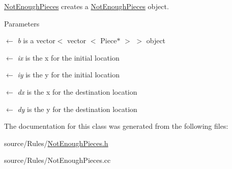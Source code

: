 \hyperlink{classNotEnoughPieces}{NotEnoughPieces} creates a \hyperlink{classNotEnoughPieces}{NotEnoughPieces} object. 
\begin{DoxyParams}{Parameters}
\item[\mbox{$\leftarrow$} {\em b}]is a vector$<$ vector $<$ Piece$\ast$ $>$ $>$ object \item[\mbox{$\leftarrow$} {\em ix}]is the x for the initial location \item[\mbox{$\leftarrow$} {\em iy}]is the y for the initial location \item[\mbox{$\leftarrow$} {\em dx}]is the x for the destination location \item[\mbox{$\leftarrow$} {\em dy}]is the y for the destination location \end{DoxyParams}


The documentation for this class was generated from the following files:\begin{DoxyCompactItemize}
\item 
source/Rules/\hyperlink{NotEnoughPieces_8h}{NotEnoughPieces.h}\item 
source/Rules/NotEnoughPieces.cc\end{DoxyCompactItemize}
